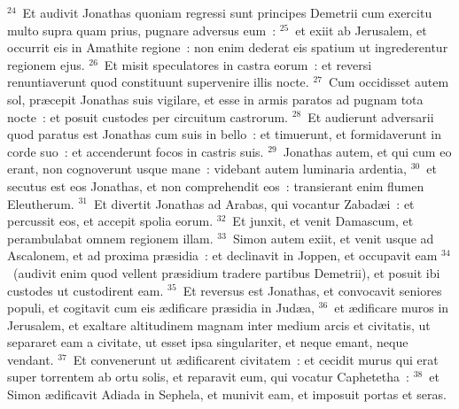 ${}^{24}$~Et audivit Jonathas quoniam regressi sunt principes Demetrii cum exercitu multo supra quam prius, pugnare adversus eum~:
${}^{25}$~et exiit ab Jerusalem, et occurrit eis in Amathite regione~: non enim dederat eis spatium ut ingrederentur regionem ejus.
${}^{26}$~Et misit speculatores in castra eorum~: et reversi renuntiaverunt quod constituunt supervenire illis nocte.
${}^{27}$~Cum occidisset autem sol, pr\ae cepit Jonathas suis vigilare, et esse in armis paratos ad pugnam tota nocte~: et posuit custodes per circuitum castrorum.
${}^{28}$~Et audierunt adversarii quod paratus est Jonathas cum suis in bello~: et timuerunt, et formidaverunt in corde suo~: et accenderunt focos in castris suis.
${}^{29}$~Jonathas autem, et qui cum eo erant, non cognoverunt usque mane~: videbant autem luminaria ardentia,
${}^{30}$~et secutus est eos Jonathas, et non comprehendit eos~: transierant enim flumen Eleutherum.
${}^{31}$~Et divertit Jonathas ad Arabas, qui vocantur Zabad\ae i~: et percussit eos, et accepit spolia eorum.
${}^{32}$~Et junxit, et venit Damascum, et perambulabat omnem regionem illam.
${}^{33}$~Simon autem exiit, et venit usque ad Ascalonem, et ad proxima pr\ae sidia~: et declinavit in Joppen, et occupavit eam
${}^{34}$~(audivit enim quod vellent pr\ae sidium tradere partibus Demetrii), et posuit ibi custodes ut custodirent eam.
${}^{35}$~Et reversus est Jonathas, et convocavit seniores populi, et cogitavit cum eis \ae dificare pr\ae sidia in Jud\ae a,
${}^{36}$~et \ae dificare muros in Jerusalem, et exaltare altitudinem magnam inter medium arcis et civitatis, ut separaret eam a civitate, ut esset ipsa singulariter, et neque emant, neque vendant.
${}^{37}$~Et convenerunt ut \ae dificarent civitatem~: et cecidit murus qui erat super torrentem ab ortu solis, et reparavit eum, qui vocatur Caphetetha~:
${}^{38}$~et Simon \ae dificavit Adiada in Sephela, et munivit eam, et imposuit portas et seras.


